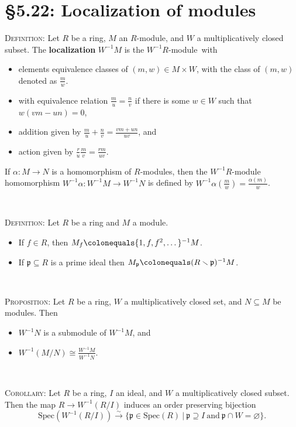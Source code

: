 \documentclass[12pt]{amsart}
\newcommand{\p}{\mathfrak{p}}
\newcommand{\Spec}{\mathrm{Spec}}
\renewcommand{\1}{\mathbbm{1}}
\newcommand{\ds}{\displaystyle}
\newcommand{\showsol}[1]{\def\displaysol{#1}}
\newcommand\ceq{\colonequals}
\begin{document}
\showsol{0}
	
	\thispagestyle{empty}
	
	\section*{\S5.22: Localization of modules}	

\begin{framed}
\noindent \textsc{Definition:} Let $R$ be a ring, $M$ an $R$-module, and $W$ a multiplicatively closed subset. 
The \mbox{\textbf{localization}} $W^{-1}M$ is the $W^{-1}R$-module\footnotemark \ with
\begin{itemize}
\item  elements  equivalence classes of $(m,w)\in M\times W$, with the class of $(m,w)$ denoted as $\ds \frac{m}{w}$.
\smallskip
\item with equivalence relation $\ds \frac{m}{u} = \frac{n}{v}$ if there is some $w\in W$ such that $w(vm-un)=0$,
\smallskip
\item addition given by $\ds\frac{m}{u} + \frac{n}{v} = \frac{vm+un}{uv}$, and
\smallskip
\item action given by $\ds\frac{r}{u}  \frac{m}{v} = \frac{rm}{uv}$.
\end{itemize}
If $\alpha:M\to N$ is a homomorphism of $R$-modules, then the $W^{-1}R$-module homomorphism ${W^{-1}\alpha: W^{-1}M\to W^{-1}N}$ is defined by $W^{-1}\alpha (\frac{m}{w}) = \frac{\alpha(m)}{w}$.


\

\noindent \textsc{Definition:} Let $R$ be a ring and $M$ a module.
\begin{itemize}
\item If $f\in R$, then $M_f \ceq \{1,f,f^2,\dots\}^{-1} M$.
\item If $\p \subseteq R$ is a prime ideal then $M_{\p} \ceq (R\smallsetminus \p)^{-1} M$.
\end{itemize}

\

\noindent \textsc{Proposition:} Let $R$ be a ring, $W$ a multiplicatively closed set, and $N\subseteq M$ be modules. Then 
\begin{itemize}
\item $W^{-1}N$ is a submodule of $W^{-1}M$, and 
\item $\ds W^{-1}(M/N) \cong \frac{W^{-1}M}{W^{-1}N}$.
\end{itemize}

\

\noindent \textsc{Corollary:} Let $R$ be a ring, $I$ an ideal, and $W$ a multiplicatively closed subset. Then the map $R\to W^{-1}(R/I)$ induces an order preserving bijection
\[ \Spec(W^{-1}(R/I)) \stackrel{\sim}{\longrightarrow} \{ \p\in \Spec(R) \ | \ \p \supseteq I \ \text{and} \ \p \cap W=\varnothing\}.\]
\end{framed}
\end{document}
